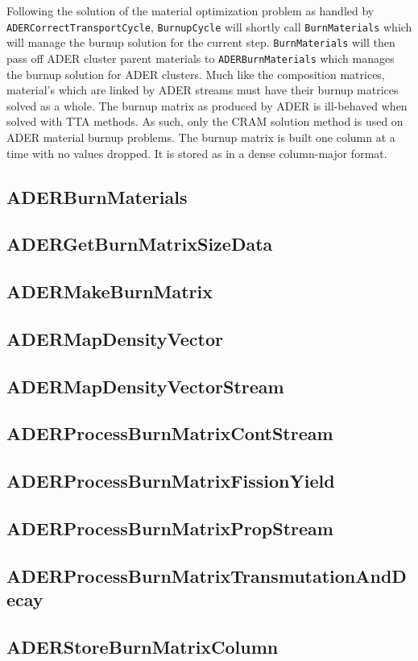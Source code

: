 Following the solution of the material optimization problem as handled by
\texttt{ADERCorrectTransportCycle}, \texttt{BurnupCycle} will shortly call
\texttt{BurnMaterials} which will manage the burnup solution for the current 
step. \texttt{BurnMaterials} will then pass off ADER cluster parent materials
to \texttt{ADERBurnMaterials} which manages the burnup solution for ADER
clusters. Much like the composition matrices, material's which are linked
by ADER streams must have their burnup matrices solved as a whole. The burnup
matrix as produced by ADER is ill-behaved when solved with TTA methods. As such,
only the CRAM solution method is used on ADER material burnup problems. The
burnup matrix is built one column at a time with no values dropped. It is stored
as in a dense column-major format. 

\subsection{ADERBurnMaterials}


\subsection{ADERGetBurnMatrixSizeData}


\subsection{ADERMakeBurnMatrix}


\subsection{ADERMapDensityVector}


\subsection{ADERMapDensityVectorStream}


\subsection{ADERProcessBurnMatrixContStream}


\subsection{ADERProcessBurnMatrixFissionYield}


\subsection{ADERProcessBurnMatrixPropStream}


\subsection{ADERProcessBurnMatrixTransmutationAndDecay}


\subsection{ADERStoreBurnMatrixColumn}


